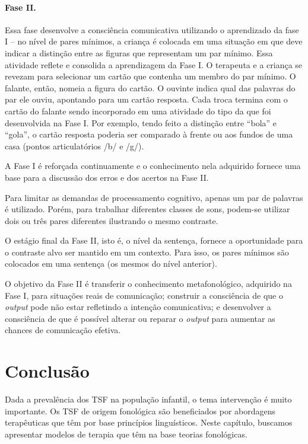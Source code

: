 \documentclass[output=paper,colorlinks,citecolor=brown,booklanguage=portuguese]{langscibook}
\begin{document}
\paragraph*{Fase II.} Essa fase desenvolve a consciência comunicativa utilizando o aprendizado da fase I -- no nível de pares mínimos, a criança é colocada em uma situação em que deve indicar a distinção entre as figuras que representam um par mínimo. Essa atividade reflete e consolida a aprendizagem da Fase I. O terapeuta e a criança se revezam para selecionar um cartão que contenha um membro do par mínimo. O falante, então, nomeia a figura do cartão. O ouvinte indica qual das palavras do par ele ouviu, apontando para um cartão resposta. Cada troca termina com o cartão do falante sendo incorporado em uma atividade do tipo da que foi desenvolvida na Fase I. Por exemplo, tendo feito a distinção entre “bola” e “gola”, o cartão resposta poderia ser comparado à frente ou aos fundos de uma casa (pontos articulatórios /b/ e /g/).

A Fase I é reforçada continuamente e o conhecimento nela adquirido fornece uma base para a discussão dos erros e dos acertos na Fase II.

Para limitar as demandas de processamento cognitivo, apenas um par de palavras é utilizado. Porém, para trabalhar diferentes classes de sons, podem-se utilizar dois ou três pares diferentes ilustrando o mesmo contraste.

O estágio final da Fase II, isto é, o nível da sentença, fornece a oportunidade para o contraste alvo ser mantido em um contexto. Para isso, os pares mínimos são colocados em uma sentença (os mesmos do nível anterior).

O objetivo da Fase II é transferir o conhecimento metafonológico, adquirido na Fase I, para situações reais de comunicação; construir a consciência de que o \emph{output} pode não estar refletindo a intenção comunicativa; e desenvolver a consciência de que é possível alterar ou reparar o \emph{output} para aumentar as chances de comunicação efetiva.

\section{Conclusão}
Dada a prevalência dos TSF na população infantil, o tema intervenção é muito importante. Os TSF de origem fonológica são beneficiados por abordagens terapêuticas que têm por base princípios linguísticos. Neste capítulo, buscamos apresentar modelos de terapia que têm na base teorias fonológicas.
\end{document}
